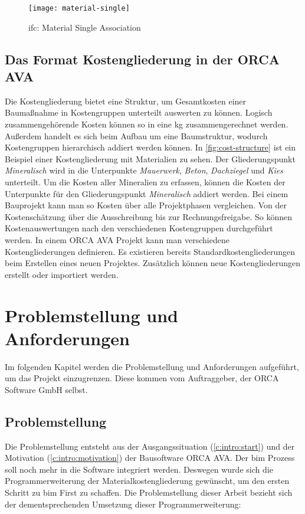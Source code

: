 \begin{figure}[h]
	\centering
	\texttt{[image: material-single]}
	\caption{\ac{ifc}: Material Single Association}
	\label{fig:material-single}
\end{figure}

\section{Das Format Kostengliederung in der ORCA AVA}
\label{c:basics:coststructure}
Die Kostengliederung bietet eine Struktur, um Gesamtkosten einer Baumaßnahme in Kostengruppen unterteilt auswerten zu können. Logisch zusammengehörende Kosten können so in eine \ac{kg} zusammengerechnet werden. Außerdem handelt es sich beim Aufbau um eine Baumstruktur, wodurch Kostengruppen hierarchisch addiert werden können. In \autoref{fig:cost-structure} ist ein Beispiel einer Kostengliederung mit Materialien zu sehen. Der Gliederungspunkt \textit{Mineralisch} wird in die Unterpunkte \textit{Mauerwerk}, \textit{Beton}, \textit{Dachziegel} und \textit{Kies} unterteilt. Um die Kosten aller Mineralien zu erfassen, können die Kosten der Unterpunkte für den Gliederungspunkt \textit{Mineralisch} addiert werden.
Bei einem Bauprojekt kann man so Kosten über alle Projektphasen vergleichen. Von der Kostenschätzung über die Ausschreibung bis zur Rechnungsfreigabe. So können Kostenauswertungen nach den verschiedenen Kostengruppen durchgeführt werden. In einem ORCA AVA Projekt kann man verschiedene Kostengliederungen definieren. Es existieren bereits Standardkostengliederungen beim Erstellen eines neuen Projektes. Zusätzlich können neue Kostengliederungen erstellt oder importiert werden.\citep[vgl.][]{helpdesk-kostengliederungen}

\chapter{Problemstellung und Anforderungen}
\label{c:requirements}
Im folgenden Kapitel werden die Problemstellung und Anforderungen aufgeführt, um das Projekt einzugrenzen. Diese kommen vom Auftraggeber, der \glqq ORCA Software GmbH\grqq{} selbst.

\section{Problemstellung}
\label{c:requirements:problem}

Die Problemstellung entsteht aus der Ausgangssituation (\autoref{c:intro:start}) und der Motivation (\autoref{c:intro:motivation}) der Bausoftware ORCA AVA. Der \ac{bim} Prozess soll noch mehr in die Software integriert werden. Deswegen wurde sich die Programmerweiterung der Materialkostengliederung gewünscht, um den ersten Schritt zu \glqq \ac{bim} First\grqq{} zu schaffen. Die Problemstellung dieser Arbeit bezieht sich der dementsprechenden Umsetzung dieser Programmerweiterung:

